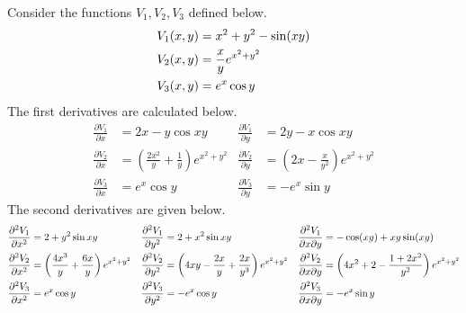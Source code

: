 \begin{answer}
	Consider the functions $V_1,V_2,V_3$ defined below.
	\begin{align}
		V_1(x,y) & = x^2 + y^2 - \sin\!\left(x y\right) \\
		V_2(x,y) & = \frac{x}{y} e^{x^2+y^2} \\
		V_3(x,y) & = e^x \cos y
	\end{align}
	The first derivatives are calculated below.
	\begin{align*}
		\frac{\partial V_1}{\partial x} & = 2x - y \cos xy
		                                & \frac{\partial V_1}{\partial y}                        & = 2y - x \cos xy                                                                \\
		\frac{\partial V_2}{\partial x} & = \left(\frac{2x^2}{y} + \frac{1}{y}\right)e^{x^2+y^2} & \frac{\partial V_2}{\partial y} & = \left(2x - \frac{x}{y^2} \right)e^{x^2+y^2} \\
		\frac{\partial V_3}{\partial x} & = e^x \cos y                                           & \frac{\partial V_3}{\partial y} & = -e^x \sin y
	\end{align*}
	The second derivatives are given below.
	\begin{align*}
		\frac{\partial^2 V_1}{\partial x^2} & = 2 + y^2 \sin xy
		                                    & \frac{\partial^2 V_1}{\partial y^2}                     & = 2 + x^2\sin xy
		                                    & \frac{\partial^2 V_1}{\partial x \partial y}            & = - \cos\!\left(x y\right) + xy \sin\!\left(x y\right)                                                                                                                                     \\
		\frac{\partial^2 V_2}{\partial x^2} & = \left(\frac{4x^3}{y} + \frac{6x}{y}\right)e^{x^2+y^2}
		                                    & \frac{\partial^2 V_2}{\partial y^2}                     & = \left(4xy - \frac{2x}{y} + \frac{2x}{y^3}\right)e^{x^2+y^2} & \frac{\partial^2 V_2}{\partial x \partial y} & = \left(4x^2+2 - \frac{1+2x^2}{y^2}\right)e^{x^2+y^2} \\
		\frac{\partial^2 V_3}{\partial x^2} & = e^x \cos y
		                                    & \frac{\partial^2 V_3}{\partial y^2}                     & = - e^x \cos y
		                                    & \frac{\partial^2 V_3}{\partial x \partial y}            & = -e^x \sin y
	\end{align*}
\end{answer}


